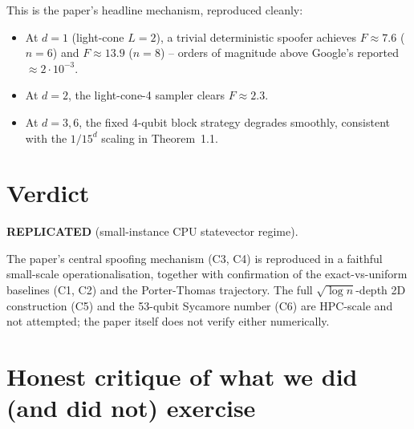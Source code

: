 \documentclass[11pt]{article}
\begin{document}
This is the paper's headline mechanism, reproduced cleanly:
\begin{itemize}
\item At $d{=}1$ (light-cone $L{=}2$), a trivial deterministic spoofer
  achieves $F\approx 7.6$ ($n{=}6$) and $F\approx 13.9$ ($n{=}8$) --
  orders of magnitude above Google's reported $\approx 2\cdot 10^{-3}$.
\item At $d{=}2$, the light-cone-4 sampler clears $F\approx 2.3$.
\item At $d{=}3,6$, the fixed 4-qubit block strategy degrades smoothly,
  consistent with the $1/15^d$ scaling in Theorem~1.1.
\end{itemize}

\section{Verdict}

\textbf{REPLICATED} (small-instance CPU statevector regime).

The paper's central spoofing mechanism (C3, C4) is reproduced in a
faithful small-scale operationalisation, together with confirmation of
the exact-vs-uniform baselines (C1, C2) and the Porter-Thomas
trajectory. The full $\sqrt{\log n}$-depth 2D construction (C5) and the
53-qubit Sycamore number (C6) are HPC-scale and not attempted; the
paper itself does not verify either numerically.

\section{Honest critique of what we did (and did not) exercise}
\end{document}
